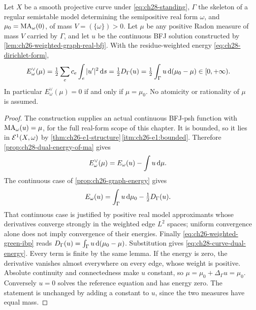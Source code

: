 \begin{proposition}
\label{prop:ch28-curve-dual-energy}
Let \(X\) be a smooth projective curve under \eqref{eq:ch28-standing},
\(\Gamma\) the skeleton of a regular semistable model determining the
semipositive real form \(\omega\), and \(\mu_0=\operatorname{MA}_\omega(0)\), of
mass \(V=(\{\omega\})>0\).  Let \(\mu\) be any positive Radon measure
of mass \(V\) carried by \(\Gamma\), and let \(u\) be the continuous
BFJ solution constructed by \cref{lem:ch26-weighted-graph-real-bfj}.
With the residue-weighted energy \eqref{eq:ch28-dirichlet-form},
\begin{equation}
\label{eq:ch28-curve-dual-energy}
 E^\vee_\omega(\mu)
 =\tfrac12\sum_e c_e\int_e|u'|^2\,\mathrm d s
 =\tfrac12D_\Gamma(u)
 =\tfrac12\int_\Gamma u\,\mathrm d(\mu_0-\mu)
 \in[0,+\infty).
\end{equation}
In particular \(E^\vee_\omega(\mu)=0\) if and only if \(\mu=\mu_0\).
No atomicity or rationality of \(\mu\) is assumed.
\end{proposition}

\begin{proof}
The construction supplies an actual continuous BFJ-psh function with
\(\operatorname{MA}_\omega(u)=\mu\), for the full real-form scope of this chapter.
It is bounded, so it lies in \(\mathcal E^1(X,\omega)\) by
\cref{thm:ch26-e1-structure}\,\cref{itm:ch26-e1:bounded}.
Therefore \cref{prop:ch28-dual-energy-of-ma} gives
\[
 E^\vee_\omega(\mu)=E_\omega(u)-\int u\,\mathrm d\mu.
\]
The continuous case of \cref{prop:ch26-graph-energy} gives
\[
 E_\omega(u)=\int_\Gamma u\,\mathrm d\mu_0-\tfrac12D_\Gamma(u).
\]
That continuous case is justified by positive real model approximants
whose derivatives converge strongly in the weighted edge \(L^2\) spaces;
uniform convergence alone does not imply convergence of their energies.
Finally \eqref{eq:ch26-weighted-green-ibp} reads
\(D_\Gamma(u)=\int_\Gamma u\,\mathrm d(\mu_0-\mu)\).
Substitution gives \eqref{eq:ch28-curve-dual-energy}.
Every term is finite by the same lemma.
If the energy is zero, the derivative vanishes almost everywhere on every
edge, whose weight is positive.  Absolute continuity and connectedness
make \(u\) constant, so \(\mu=\mu_0+\Delta_\Gamma u=\mu_0\).
Conversely \(u=0\) solves the reference equation and has energy zero.
The statement is unchanged by adding a constant to \(u\), since the
two measures have equal mass.
\end{proof}

